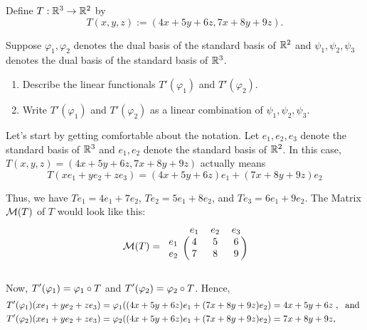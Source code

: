 \begin{xrcs}
  Define $T: \mathbb{R}^3 \to \mathbb{R}^2$ by
  \begin{equation}
    T(x, y, z) := (4x + 5y + 6z, 7x + 8y + 9z).
  \end{equation}

  Suppose $\varphi_1, \varphi_2$ denotes the dual basis of the standard basis of $\mathbb{R}^2$ and $\psi_1, \psi_2, \psi_3$ denotes the dual basis of the standard basis of $\mathbb{R}^3$.
  \begin{enumerate}
    \item Describe the linear functionals $T'(\varphi_1)$ and $T'(\varphi_2)$.
    \item Write $T'(\varphi_1)$ and $T'(\varphi_2)$ as a linear combination of $\psi_1, \psi_2, \psi_3$.
  \end{enumerate}

  \begin{xsol}
    Let's start by getting comfortable about the notation. Let $e_1, e_2, e_3$ denote the standard basis of $\mathbb{R}^3$ and $e_1, e_2$ denote the standard basis of $\mathbb{R}^2$. In this case, $T(x, y, z) = (4x + 5y + 6z, 7x + 8y + 9z)$ actually means
    \begin{equation}
      T(x e_1 + y e_2 + z e_3) = (4x + 5y + 6z) e_1 + (7x + 8y + 9z) e_2
    \end{equation}

    Thus, we have $T e_1 = 4e_1 + 7 e_2$, $T e_2 = 5e_1 + 8e_2$, and $T e_3 = 6e_1 + 9 e_2$. The Matrix $\mathcal{M}(T)$ of $T$ would look like this:
    \begin{equation}
      \mathcal{M} (T) =
      \begin{blockarray}{cccc}
        & e_1 & e_2 & e_3  \\
        \begin{block}{c(ccc)}
          e_1 & 4   & 5   & 6    \\
          e_2 & 7   & 8   & 9    \\
        \end{block}
      \end{blockarray}
    \end{equation}

    Now, $\displaystyle T' (\varphi_1) = \varphi_1 \circ T$ and $\displaystyle T' (\varphi_2) = \varphi_2 \circ T$. Hence,
    \begin{equation}
      \begin{aligned}
        &\displaystyle T' (\varphi_1) (x e_1 + y e_2 + z e_3) = \varphi_1 ((4x + 5y + 6z) e_1 + (7x + 8y + 9z) e_2 ) = 4x + 5y + 6z \;, \; \text{ and } \\
        &\displaystyle T' (\varphi_2) (x e_1 + y e_2 + z e_3) = \varphi_2 ((4x + 5y + 6z) e_1 + (7x + 8y + 9z) e_2 ) = 7x + 8y + 9z,
      \end{aligned}
    \end{equation}


\end{xsol}
\end{xrcs}
